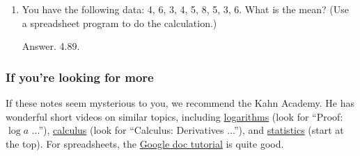 \documentclass[letterpaper,12pt]{article}
\begin{document}
\begin{enumerate}
\item You have the following data:
4, 6, 3, 4, 5, 8, 5, 3, 6.
What is the mean?  (Use a spreadsheet program to do the calculation.)

Answer.  4.89.


\begin{comment}
\item (optional) A two-period consumption problem illustrates both
how to maximize a function and how consumers might decide how much to consume now
and how much to save for future spending.
Let us say that a consumer must choose how much to consume in period 1
(say, $c_1$)
and how much to consume in period 2 ($c_2$).
Preferences are represented by a utility function such as
\[
    u(c_1,c_2) \;=\; \log c_1 + \beta \log c_2 ,
\]
where log is a convenient function (note that it has diminishing marginal utility)
and $\beta< 1$ discounts period-2 utility relative to period-1.
The consumer maximizes this function subject to the budget constraint,
\[
    c_1 + c_2/(1+r) \;=\;  y_1 + y_2/(1+r) \;=\; V,
\]
where $r$ is the interest rate.
In words:  the present value of consumption equals the present value of income.
We denote the latter by $V$ to save ourselves some typing later on.
How much does the agent consume in period 1?

Answer.  Use the budget constraint to substitute for $c_2$ in the utility
function: $c_2 = (1+r) (V - c_1)$ and $ u(c_1,c_2) = \log c_1 +
\beta \log [(1+r)(V-c_1)] $. If we differentiate utility with
respect to $c_1$, we find
\[
    1/c_1 \;=\; \beta/(V-c_1)
\]
or $ c_1 = (1+\beta)^{-1} V$.]
\end{comment}

\end{enumerate}



\subsubsection*{If you're looking for more}

If these notes seem mysterious to you,
we recommend the Kahn Academy.
He has wonderful short videos on similar topics,
including
\href{http://www.khanacademy.org/#algebra}{logarithms} (look for ``Proof:  $\log a$ ...''),
\href{http://www.khanacademy.org/#calculus}{calculus} (look for ``Calculus:  Derivatives ...''),
and
\href{http://www.khanacademy.org/#statistics}{statistics} (start at the top).
For spreadsheets, the
\href{https://docs.google.com/support/bin/answer.py?hl=en&answer=140784&topic=20322&rd=1}
{Google doc tutorial}
is quite good.
\end{document}
